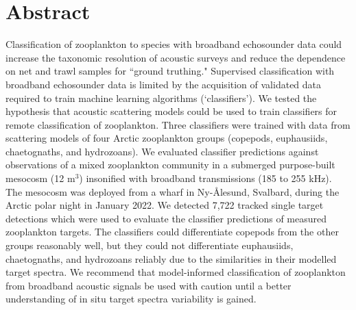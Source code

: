 \section{Abstract}
Classification of zooplankton to species with broadband echosounder data could increase the taxonomic resolution of acoustic surveys and reduce the dependence on net and trawl samples for ``ground truthing." Supervised classification with broadband echosounder data is limited by the acquisition of validated data required to train machine learning algorithms (`classifiers'). We tested the hypothesis that acoustic scattering models could be used to train classifiers for remote classification of zooplankton. Three classifiers were trained with data from scattering models of four Arctic zooplankton groups (copepods, euphausiids, chaetognaths, and hydrozoans). We evaluated classifier predictions against observations of a mixed zooplankton community in a submerged purpose-built mesocosm (12 m$^3$) insonified with broadband transmissions (185 to 255 kHz). The mesocosm was deployed from a wharf in Ny-Ålesund, Svalbard, during the Arctic polar night in January 2022. We detected 7,722 tracked single target detections which were used to evaluate the classifier predictions of measured zooplankton targets. The classifiers could differentiate copepods from the other groups reasonably well, but they could not differentiate euphausiids, chaetognaths, and hydrozoans reliably due to the similarities in their modelled target spectra. We recommend that model-informed classification of zooplankton from broadband acoustic signals be used with caution until a better understanding of in situ target spectra variability is gained.

